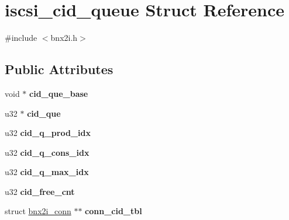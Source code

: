 \hypertarget{structiscsi__cid__queue}{
\section{iscsi\_\-cid\_\-queue Struct Reference}
\label{structiscsi__cid__queue}
}


{\ttfamily \#include $<$bnx2i.h$>$}

\subsection*{Public Attributes}
\begin{DoxyCompactItemize}
\item 
\hypertarget{structiscsi__cid__queue_a07f6e3c9af890eb54bf652cf952e8811}{
void $\ast$ {\bfseries cid\_\-que\_\-base}}
\label{structiscsi__cid__queue_a07f6e3c9af890eb54bf652cf952e8811}

\item 
\hypertarget{structiscsi__cid__queue_a4e866fea9222a2e857d767e945f4f068}{
u32 $\ast$ {\bfseries cid\_\-que}}
\label{structiscsi__cid__queue_a4e866fea9222a2e857d767e945f4f068}

\item 
\hypertarget{structiscsi__cid__queue_a9d5aaee8a0892d705332c083857edf67}{
u32 {\bfseries cid\_\-q\_\-prod\_\-idx}}
\label{structiscsi__cid__queue_a9d5aaee8a0892d705332c083857edf67}

\item 
\hypertarget{structiscsi__cid__queue_a8c57ac368b6ef29b2e494eeaaac6b739}{
u32 {\bfseries cid\_\-q\_\-cons\_\-idx}}
\label{structiscsi__cid__queue_a8c57ac368b6ef29b2e494eeaaac6b739}

\item 
\hypertarget{structiscsi__cid__queue_a988fff35ac375d146cbe905ce3a67ca6}{
u32 {\bfseries cid\_\-q\_\-max\_\-idx}}
\label{structiscsi__cid__queue_a988fff35ac375d146cbe905ce3a67ca6}

\item 
\hypertarget{structiscsi__cid__queue_ae60917d32fd93ec745b076bd3f8c0745}{
u32 {\bfseries cid\_\-free\_\-cnt}}
\label{structiscsi__cid__queue_ae60917d32fd93ec745b076bd3f8c0745}

\item 
\hypertarget{structiscsi__cid__queue_ac8c762bff5cf24fbe77dbaf2de0af240}{
struct \hyperlink{structbnx2i__conn}{bnx2i\_\-conn} $\ast$$\ast$ {\bfseries conn\_\-cid\_\-tbl}}
\label{structiscsi__cid__queue_ac8c762bff5cf24fbe77dbaf2de0af240}

\end{DoxyCompactItemize}


